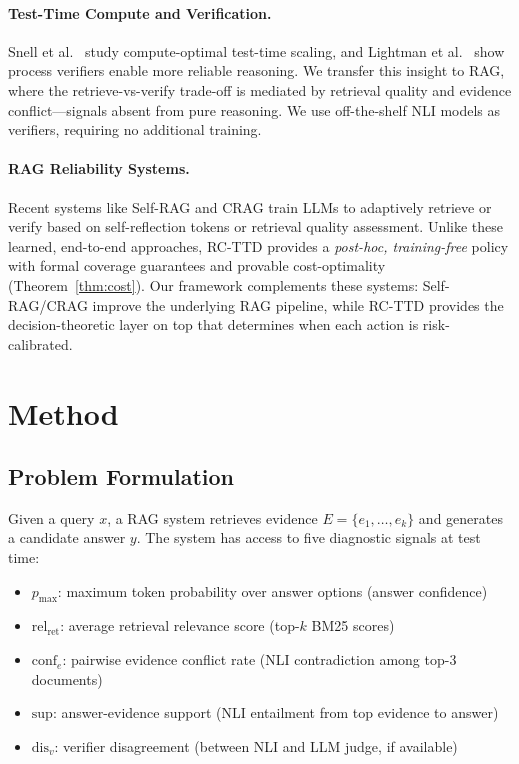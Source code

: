 \documentclass[letterpaper]{article}
\begin{document}
\paragraph{Test-Time Compute and Verification.}
Snell et al.~\cite{snell2024solve} study compute-optimal test-time scaling, and Lightman et al.~\cite{lightman2023let} show process verifiers enable more reliable reasoning. We transfer this insight to RAG, where the retrieve-vs-verify trade-off is mediated by retrieval quality and evidence conflict---signals absent from pure reasoning. We use off-the-shelf NLI models \cite{he2021deberta,honovich2022evaluating,williams2018broad} as verifiers, requiring no additional training.

\paragraph{RAG Reliability Systems.}
Recent systems like Self-RAG \cite{asai2024selfrag} and CRAG \cite{yan2024crag} train LLMs to adaptively retrieve or verify based on self-reflection tokens or retrieval quality assessment. Unlike these learned, end-to-end approaches, RC-TTD provides a \emph{post-hoc, training-free} policy with formal coverage guarantees and provable cost-optimality (Theorem~\ref{thm:cost}). Our framework complements these systems: Self-RAG/CRAG improve the underlying RAG pipeline, while RC-TTD provides the decision-theoretic layer on top that determines when each action is risk-calibrated.

\section{Method}

\subsection{Problem Formulation}

Given a query $x$, a RAG system retrieves evidence $E = \{e_1, \ldots, e_k\}$ and generates a candidate answer $y$. The system has access to five diagnostic signals at test time:
\begin{itemize}
    \item $p_{\max}$: maximum token probability over answer options (answer confidence)
    \item $\text{rel}_{\text{ret}}$: average retrieval relevance score (top-$k$ BM25 scores)
    \item $\text{conf}_e$: pairwise evidence conflict rate (NLI contradiction among top-3 documents)
    \item $\text{sup}$: answer-evidence support (NLI entailment from top evidence to answer)
    \item $\text{dis}_v$: verifier disagreement (between NLI and LLM judge, if available)
\end{itemize}
\end{document}

